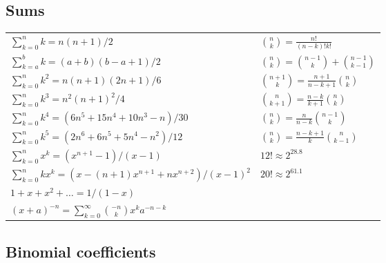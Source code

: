 \documentclass[12pt]{extarticle}
\begin{document}
\begin{multicols*}{2}
\subsection{Sums}

\begin{tabular}{l l}
    $\sum_{k=0}^n k = n(n+1)/2$		& ${n \choose k} = \frac{n!}{(n-k)!k!}$ \\
    $\sum_{k=a}^b k = (a+b)(b-a+1)/2$   & ${n \choose k} = {n-1 \choose k} + {n-1 \choose k-1}$ \\
    $\sum_{k=0}^n k^2 = n(n+1)(2n+1)/6$ & ${n+1 \choose k} = \frac{n+1}{n-k+1} {n \choose k}$   \\
    $\sum_{k=0}^n k^3 = n^2(n+1)^2/4$   & ${n \choose k+1} = \frac{n-k}{k+1} {n \choose k}$     \\
    $\sum_{k=0}^n k^4 = (6n^5 + 15n^4 + 10n^3 - n)/30$  & ${n \choose k} = \frac{n}{n-k} {n-1 \choose k}$       \\
    $\sum_{k=0}^n k^5 = (2n^6 + 6n^5 + 5n^4 - n^2)/12$  & ${n \choose k} = \frac{n-k+1}{k} {n \choose k-1}$     \\
    $\sum_{k=0}^n x^k = (x^{n+1} - 1)/(x - 1)$  & $12! \approx 2^{28.8}$ \\
    $\sum_{k=0}^n kx^k = (x - (n+1)x^{n+1} + nx^{n+2})/(x-1)^2$	& $20! \approx 2^{61.1}$ \\
    $1 + x + x^2 + \dots = 1 / (1 - x)$ \\
    $(x+a)^{-n} = \sum_{k=0}^{\infty} {-n \choose k} x^k a^{-n-k}$ \\
\end{tabular}


\subsection{Binomial coefficients}


\end{multicols*}
\end{document}
